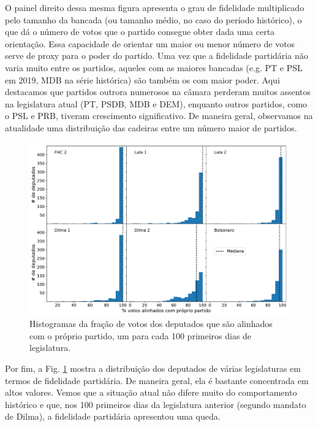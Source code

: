 \documentclass[12pt,a4paper]{article}
\begin{document}
O painel direito dessa mesma figura apresenta o grau de fidelidade multiplicado pelo tamanho da bancada
(ou tamanho médio, no caso do período histórico), o que dá o número de votos que o partido consegue
obter dada uma certa orientação. Essa capacidade de orientar um maior ou menor número de votos serve de proxy para o poder do partido. Uma vez que a fidelidade partidária não varia muito entre os partidos,
aqueles com as maiores bancadas (e.g. PT e PSL em 2019, MDB na série histórica) são também os com maior poder. Aqui destacamos que partidos outrora numerosos na câmara perderam
muitos assentos na legislatura atual (PT, PSDB, MDB e DEM), enquanto outros partidos, como o PSL e PRB,
tiveram crescimento significativo. De maneira geral, observamos na atualidade uma distribuição das
cadeiras entre um número maior de partidos.

\begin{figure}[H]
\centering
\includegraphics[width=1.0\textwidth]{graficos/fidelidade_partidaria_deputados_2019-05-09.pdf}
\caption{Histogramas da fração de votos dos deputados que são alinhados com o próprio partido, um para
  cada 100 primeiros dias de legislatura.}
\label{fig:fid-poder-deputado}
\end{figure} 

Por fim, a Fig. \ref{fig:fid-poder-deputado} mostra a distribuição dos deputados de várias legislaturas
em termos de fidelidade partidária. De maneira geral, ela é bastante concentrada em altos valores. Vemos
que a situação atual não difere muito do comportamento histórico e que, nos 100 primeiros dias da legislatura
anterior (segundo mandato de Dilma), a fidelidade partidária apresentou uma queda. 


\end{document}
